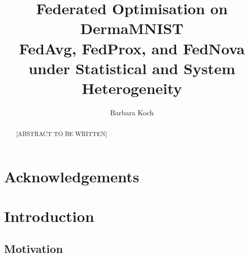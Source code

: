 \documentclass[11pt,a4paper]{report}
\title{Federated Optimisation on DermaMNIST\\
\large FedAvg, FedProx, and FedNova under Statistical and System Heterogeneity}
\author{Barbara Koch}
\date{}
\begin{document}

\maketitle

\begin{abstract}
[ABSTRACT TO BE WRITTEN]
\end{abstract}

\chapter*{Acknowledgements}

\tableofcontents
\listoffigures
\listoftables


\chapter{Introduction}
\label{ch:intro}


\section{Motivation}
\label{sec:intro-motivation}
\end{document}

